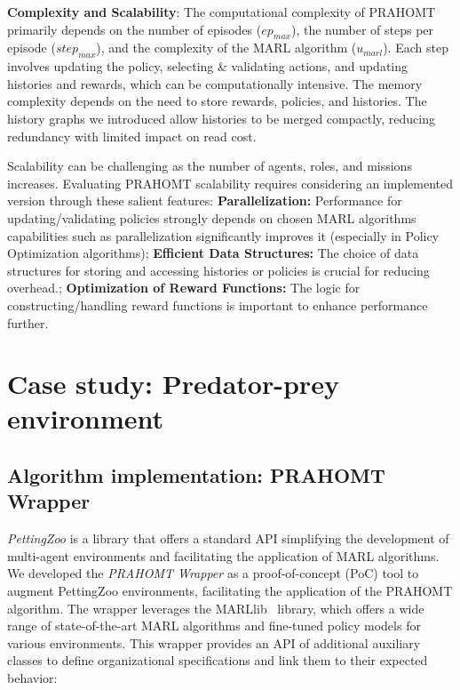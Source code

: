 \documentclass[runningheads]{llncs}
\theoremstyle{freethm}
\theoremstyle{proofoutline}
\newcounter{proof}
\begin{document}
\textbf{Complexity and Scalability}: \quad The computational complexity of PRAHOMT primarily depends on the number of episodes ($ep_{max}$), the number of steps per episode ($step_{max}$), and the complexity of the MARL algorithm ($u_{marl}$). Each step involves updating the policy, selecting \& validating actions, and updating histories and rewards, which can be computationally intensive. The memory complexity depends on the need to store rewards, policies, and histories. The history graphs we introduced allow histories to be merged compactly, reducing redundancy with limited impact on read cost.

Scalability can be challenging as the number of agents, roles, and missions increases. Evaluating PRAHOMT scalability requires considering an implemented version through these salient features: \quad
\textbf{Parallelization:} Performance for updating/validating policies strongly depends on chosen MARL algorithms capabilities such as parallelization significantly improves it (especially in Policy Optimization algorithms); \quad
\textbf{Efficient Data Structures:} The choice of data structures for storing and accessing histories or policies is crucial for reducing overhead.; \quad
\textbf{Optimization of Reward Functions:} The logic for constructing/handling reward functions is important to enhance performance further.



\section{Case study: Predator-prey environment}\label{sec:case_study}

\subsection{Algorithm implementation: PRAHOMT Wrapper}

\emph{PettingZoo} is a library that offers a standard API simplifying the development of multi-agent environments and facilitating the application of MARL algorithms.
%
We developed the \textit{PRAHOMT Wrapper}
%
%
as a proof-of-concept (PoC) tool to augment PettingZoo environments, facilitating the application of the PRAHOMT algorithm. The wrapper leverages the MARLlib~\cite{hu2022marllib} library, which offers a wide range of state-of-the-art MARL algorithms and fine-tuned policy models for various environments.
This wrapper provides an API of additional auxiliary classes to define organizational specifications and link them to their expected behavior:
\end{document}
